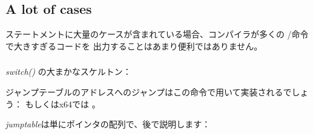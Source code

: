 ﻿\subsection{A lot of cases}

ステートメントに大量のケースが含まれている場合、コンパイラが多くの \JE/\JNE 命令で大きすぎるコードを
出力することはあまり便利ではありません。







\subsubsection{\Conclusion{}}

\emph{switch()} の大まかなスケルトン：



ジャンプテーブルのアドレスへのジャンプはこの命令で用いて実装されるでしょう：
もしくはx64では 。

\emph{jumptable}は単にポインタの配列で、後で説明します：
